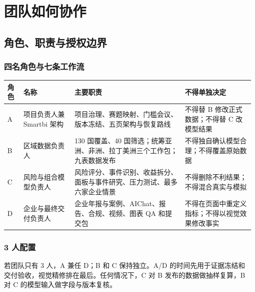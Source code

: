 \documentclass[UTF8,12pt,openany]{ctexbook}
\begin{document}
\tableofcontents

\mainmatter
\part{团队如何协作}

\chapter{角色、职责与授权边界}

\section{四名角色与七条工作流}
\begin{longtable}{p{1.1cm}p{3.2cm}p{5.3cm}p{4.4cm}}
\toprule
\textbf{角色} & \textbf{名称} & \textbf{主要职责} & \textbf{不得单独决定}\\
\midrule
A & 项目负责人兼 Smartbi 架构 & 项目治理、赛题映射、门槛会议、版本冻结、五页架构与恢复路线 & 不得替 B 修改正式数据；不得替 C 改模型结果\\
B & 区域数据负责人 & 130 国覆盖、40 国筛选；统筹亚洲、非洲、拉丁美洲三个工作包；九表数据发布 & 不得独自确认模型合理；不得覆盖原始数据\\
C & 风险与组合模型负责人 & 风险评分、事件识别、收益拆分、面板与事件研究、压力测试、最多六家企业情景 & 不得删除不利结果；不得混合真实与模拟\\
D & 企业与最终交付负责人 & 企业年报与案例、AIChat、报告、合规、视频、图表 QA 和提交包 & 不得在页面中重定义指标；不得以视觉效果修改事实\\
\bottomrule
\end{longtable}

\section{3 人配置}
若团队只有 3 人，A 兼任 D；B 和 C 保持独立。A/D 的时间先用于证据冻结和交付验收，视觉精修排在最后。任何情况下，C 对 B 发布的数据做抽样复算，B 对 C 的模型输入做字段与版本复核。
\end{document}

